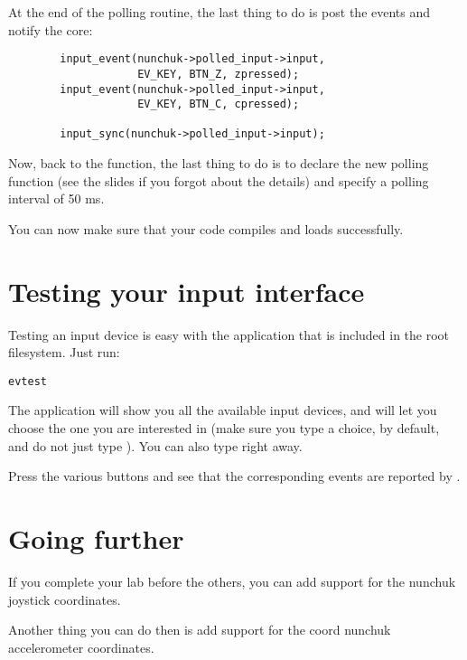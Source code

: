 At the end of the polling routine, the last thing to do is post the events 
and notify the  core:

\begin{verbatim}
        input_event(nunchuk->polled_input->input,
                    EV_KEY, BTN_Z, zpressed);
        input_event(nunchuk->polled_input->input,
                    EV_KEY, BTN_C, cpressed);

        input_sync(nunchuk->polled_input->input);
\end{verbatim}

Now, back to the  function, the last thing to do
is to declare the new polling function (see the slides if you forgot
about the details) and specify a polling interval of 50 ms.

You can now make sure that your code compiles and loads successfully.

\section{Testing your input interface}

Testing an input device is easy with the  application
that is included in the root filesystem. Just run:

\begin{verbatim}
evtest
\end{verbatim}

The application will show you all the available input devices, and will let
you choose the one you are interested in (make sure you type a choice,
 by default, and do not just type \code{[Enter]}). You can also
type  right away.

Press the various buttons and see that the corresponding events are
reported by .

\section{Going further}

If you complete your lab before the others, you can add support for the
nunchuk joystick coordinates.

Another thing you can do then is add support for the coord nunchuk accelerometer
coordinates.
